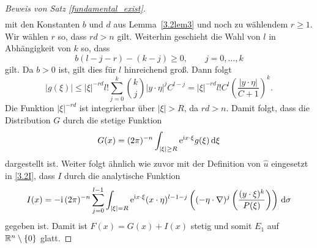 \begin{proof}[Beweis von Satz \ref{fundamental_exist}]
\begin{equation}
\begin{split}
\end{split}
\end{equation}
mit den Konstanten $b$ und $d$ aus Lemma~\ref{3.2lem3} und noch zu wählendem $r\ge1$. Wir wählen $r$ so, dass $rd>n$ gilt. Weiterhin geschieht die Wahl von $l$ in Abhängigkeit von $k$ so, dass 
\begin{equation}
b(l-j-r) -(k-j) \ge 0,\qquad j=0,\ldots,k
\end{equation}
gilt. Da $b>0$ ist, gilt dies für $l$ hinreichend groß. Dann folgt 
\begin{equation}
|g(\xi)| \le |\xi|^{-rd} l! \sum_{j=0}^k \binom{k}{j} |y\cdot \eta|^j C^{l-j} = | \xi|^{-rd} l! C^l \left ( \frac{|y\cdot\eta|}{C+1} \right )^k.
\end{equation}
Die Funktion $|\xi|^{-rd}$ ist integrierbar über $|\xi|>R$, da $rd >n$.  Damit folgt, dass die Distribution $G$ durch die stetige Funktion
\begin{equation}
G(x) = (2\pi)^{-n} \int_{|\xi|\ge R}  \mathrm e^{\mathrm i x\cdot \xi} g(\xi)\,\mathrm d \xi
\end{equation}
dargestellt ist. Weiter folgt ähnlich wie zuvor mit der Definition von $\widehat u$ eingesetzt in \eqref{3.2I}, dass $I$ durch die analytische Funktion 
\begin{equation}
I(x) = -\mathrm i\,(2\pi)^{-n} \sum_{j=0}^{l-1} \int_{|\xi|=R}\mathrm e^{\mathrm i x\cdot \xi} (x\cdot \eta)^{l-1-j}  \left ( (-\eta \cdot \nabla)^{j} \left ( \frac{(y\cdot \xi)^k}{P(\xi)} \right ) \right )\,\mathrm d \sigma
\end{equation} 
gegeben ist. Damit ist $F(x)=G(x)+I(x)$ stetig und somit $E_1$ auf $\mathbb R^n\setminus\{0\}$ glatt.
\end{proof}

%
%
%
%

